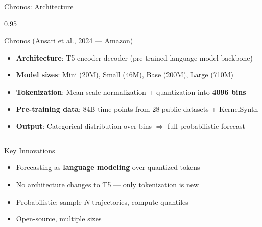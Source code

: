 \documentclass[9pt, aspectratio=169, t]{beamer}
\begin{document}
\begin{frame}{Chronos: Architecture}
    \begin{cminipage}{0.95\textwidth}
    \vspace{-3mm}
    {\scriptsize
    \begin{block}{Chronos (Ansari et al., 2024 --- Amazon)}
        \vspace{-1mm}
        \begin{itemize}\setlength{\itemsep}{0pt}
            \item \textbf{Architecture}: T5 encoder-decoder (pre-trained language model backbone)
            \item \textbf{Model sizes}: Mini (20M), Small (46M), Base (200M), Large (710M)
            \item \textbf{Tokenization}: Mean-scale normalization + quantization into \textbf{4096 bins}
            \item \textbf{Pre-training data}: 84B time points from 28 public datasets + KernelSynth
            \item \textbf{Output}: Categorical distribution over bins $\Rightarrow$ full probabilistic forecast
        \end{itemize}
        \vspace{-1mm}
    \end{block}
    \vspace{-2.5mm}
    \begin{columns}[T]
        \begin{exampleblock}{Key Innovations}
            \begin{itemize}\setlength{\itemsep}{0pt}
                \item Forecasting as \textbf{language modeling} over quantized tokens
                \item No architecture changes to T5 --- only tokenization is new
                \item Probabilistic: sample $N$ trajectories, compute quantiles
                \item Open-source, multiple sizes
            \end{itemize}
        \end{exampleblock}


\end{columns}}
\end{cminipage}
\end{frame}
\end{document}

